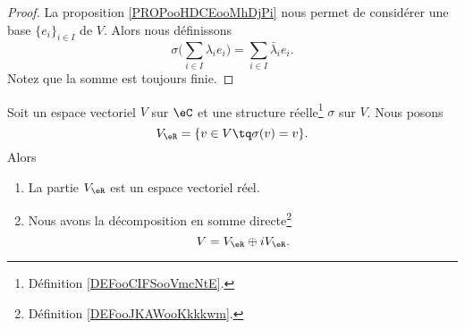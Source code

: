 \begin{proof}
    La proposition \ref{PROPooHDCEooMhDjPi} nous permet de considérer une base \( \{ e_i \}_{i\in I}\) de \( V\). Alors nous définissons
    \begin{equation}
        \sigma\big( \sum_{i\in I}\lambda_ie_i \big)=\sum_{i\in I}\bar\lambda_ie_i.
    \end{equation}
    Notez que la somme est toujours finie.
\end{proof}

\begin{proposition}
    Soit un espace vectoriel \( V\) sur \( \eC\) et une structure réelle\footnote{Définition \ref{DEFooCIFSooVmcNtE}.} \( \sigma\) sur \( V\). Nous posons
    \begin{equation}
        V_{\eR}=\{ v\in V\tq \sigma(v)=v \}.
    \end{equation}
    Alors
    \begin{enumerate}
        \item
            La partie \( V_{\eR}\) est un espace vectoriel réel.
        \item
            Nous avons la décomposition en somme directe\footnote{Définition \ref{DEFooJKAWooKkkkwm}.}
            \begin{equation}
                V=V_{\eR}\oplus iV_{\eR}.
            \end{equation}
    \end{enumerate}
\end{proposition}

